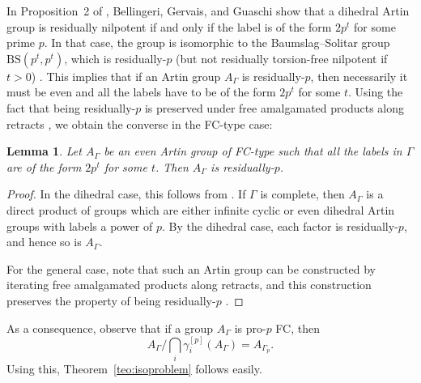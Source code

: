 \documentclass[10pt, oneside]{amsart}
\newtheorem{lemma}[theorem]{Lemma}
\theoremstyle{definition}
\theoremstyle{remark}
\theoremstyle{plain}
\begin{document}
In Proposition~2 of \cite{BGG}, Bellingeri, Gervais, and Guaschi show that a dihedral Artin group is residually nilpotent if and only if the label is of the form $2p^t$ for some prime $p$. In that case, the group is isomorphic to the Baumslag--Solitar group $\mathrm{BS}(p^t,p^t)$, which is residually-$p$ (but not residually torsion-free nilpotent if $t>0$) \cite{Moldavanskii}. This implies that if an Artin group $A_\Gamma$ is residually-$p$, then necessarily it must be even and all the labels have to be of the form $2p^t$ for some $t$. Using the fact that being residually-$p$ is preserved under free amalgamated products along retracts \cite{BS}, we obtain the converse in the FC-type case:

\begin{lemma}\label{lem:resp}
Let $A_\Gamma$ be an even Artin group of FC-type such that all the labels in $\Gamma$ are of the form $2p^t$ for some $t$. Then $A_\Gamma$ is residually-$p$.
\end{lemma}

\begin{proof}
In the dihedral case, this follows from \cite{Moldavanskii}. If $\Gamma$ is complete, then $A_\Gamma$ is a direct product of groups which are either infinite cyclic or even dihedral Artin groups with labels a power of $p$. By the dihedral case, each factor is residually-$p$, and hence so is $A_\Gamma$. 

For the general case, note that such an Artin group can be constructed by iterating free amalgamated products along retracts, and this construction preserves the property of being residually-$p$ \cite{BS}.
\end{proof}

As a consequence, observe that if a group $A_{\Gamma}$ is pro-$p$ FC, then
$$A_\Gamma \big/ \bigcap_i \gamma_i^{[p]}(A_\Gamma)=A_{\Gamma_p}.$$
Using this, Theorem~\ref{teo:isoproblem} follows easily.



\bigskip
\end{document}
